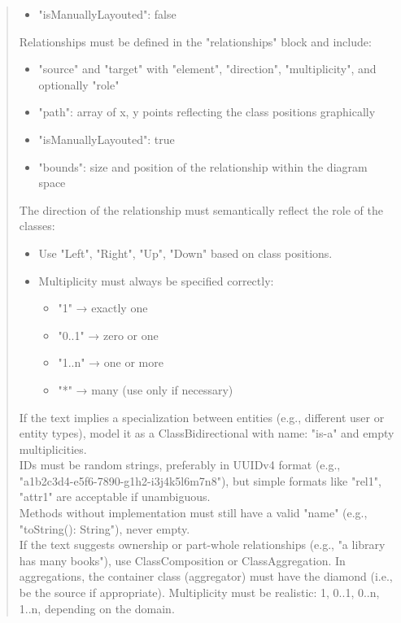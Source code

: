\begin{quote}
\begin{itemize}
        \item "isManuallyLayouted": false
    \end{itemize}
    Relationships must be defined in the "relationships" block and include:
    \begin{itemize}
        \item "source" and "target" with "element", "direction", "multiplicity", and optionally "role"
        \item "path": array of {x, y} points reflecting the class positions graphically
        \item "isManuallyLayouted": true
        \item "bounds": size and position of the relationship within the diagram space
    \end{itemize}
    The direction of the relationship must semantically reflect the role of the classes:
    \begin{itemize}
        \item Use "Left", "Right", "Up", "Down" based on class positions.
        \item Multiplicity must always be specified correctly:
        \begin{itemize}
            \item "1" → exactly one
            \item "0..1" → zero or one
            \item "1..n" → one or more
            \item "*" → many (use only if necessary)
        \end{itemize}
    \end{itemize}
    If the text implies a specialization between entities (e.g., different user or entity types), model it as a ClassBidirectional with name: "is-a" and empty multiplicities.\\
    IDs must be random strings, preferably in UUIDv4 format (e.g., "a1b2c3d4-e5f6-7890-g1h2-i3j4k5l6m7n8"), but simple formats like "rel1", "attr1" are acceptable if unambiguous.\\
    Methods without implementation must still have a valid "name" (e.g., "toString(): String"), never empty.\\
    If the text suggests ownership or part-whole relationships (e.g., "a library has many books"), use ClassComposition or ClassAggregation. In aggregations, the container class (aggregator) must have the diamond (i.e., be the source if appropriate). Multiplicity must be realistic: 1, 0..1, 0..n, 1..n, depending on the domain.\\

\end{quote}
